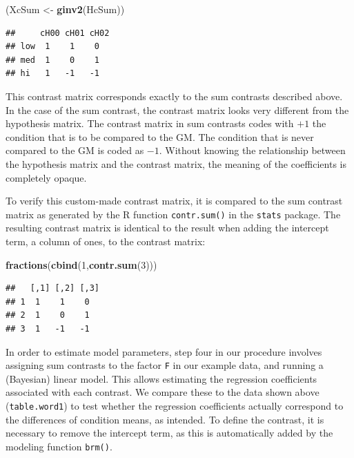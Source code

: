 \documentclass[12pt,]{krantz}
\newenvironment{Shaded}{\begin{snugshade}}{\end{snugshade}}
\newcommand{\KeywordTok}[1]{\textcolor[rgb]{0.13,0.29,0.53}{\textbf{#1}}}
\newcommand{\DecValTok}[1]{\textcolor[rgb]{0.00,0.00,0.81}{#1}}
\newcommand{\StringTok}[1]{\textcolor[rgb]{0.31,0.60,0.02}{#1}}
\newcommand{\NormalTok}[1]{#1}
\theoremstyle{definition}
\theoremstyle{definition}
\theoremstyle{definition}
\theoremstyle{remark}
\begin{document}
\begin{Shaded}
\begin{Highlighting}[]
\NormalTok{(XcSum <-}\StringTok{ }\KeywordTok{ginv2}\NormalTok{(HcSum))}
\end{Highlighting}
\end{Shaded}

\begin{verbatim}
##     cH00 cH01 cH02
## low  1    1    0  
## med  1    0    1  
## hi   1   -1   -1
\end{verbatim}

This contrast matrix corresponds exactly to the sum contrasts described
above. In the case of the sum contrast, the contrast matrix looks very
different from the hypothesis matrix. The contrast matrix in sum
contrasts codes with \(+1\) the condition that is to be compared to the
GM. The condition that is never compared to the GM is coded as \(-1\).
Without knowing the relationship between the hypothesis matrix and the
contrast matrix, the meaning of the coefficients is completely opaque.

To verify this custom-made contrast matrix, it is compared to the sum
contrast matrix as generated by the R function \texttt{contr.sum()} in
the \texttt{stats} package. The resulting contrast matrix is identical
to the result when adding the intercept term, a column of ones, to the
contrast matrix:

\begin{Shaded}
\begin{Highlighting}[]
\KeywordTok{fractions}\NormalTok{(}\KeywordTok{cbind}\NormalTok{(}\DecValTok{1}\NormalTok{,}\KeywordTok{contr.sum}\NormalTok{(}\DecValTok{3}\NormalTok{)))}
\end{Highlighting}
\end{Shaded}

\begin{verbatim}
##   [,1] [,2] [,3]
## 1  1    1    0  
## 2  1    0    1  
## 3  1   -1   -1
\end{verbatim}

In order to estimate model parameters, step four in our procedure
involves assigning sum contrasts to the factor \texttt{F} in our example
data, and running a (Bayesian) linear model. This allows estimating the
regression coefficients associated with each contrast. We compare these
to the data shown above (\texttt{table.word1}) to test whether the
regression coefficients actually correspond to the differences of
condition means, as intended. To define the contrast, it is necessary to
remove the intercept term, as this is automatically added by the
modeling function \texttt{brm()}.
\end{document}
